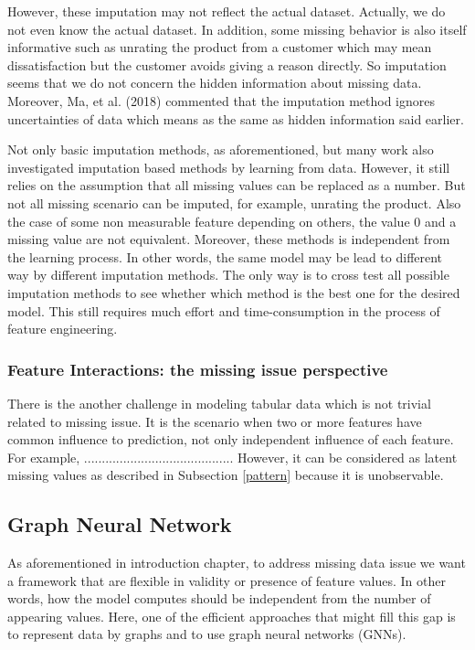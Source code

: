 However, these imputation may not reflect the actual dataset. \cite{...}
Actually, we do not even know the actual dataset.
In addition, some missing behavior is also itself informative \cite{...} such as unrating the product from a customer which may mean dissatisfaction but the customer avoids giving a reason directly.
So imputation seems that we do not concern the hidden information about missing data.
Moreover, Ma, et al. (2018) \cite{Ma} commented that the imputation method ignores uncertainties of data which means as the same as hidden information said earlier.

Not only basic imputation methods, as aforementioned, but many work also investigated imputation based methods by learning from data.
However, it still relies on the assumption that all missing values can be replaced as a number.
But not all missing scenario can be imputed, for example, unrating the product.
Also the case of some non measurable feature depending on others, the value 0 and a missing value are not equivalent.
Moreover, these methods is independent from the learning process.
In other words, the same model may be lead to different way by different imputation methods.
The only way is to cross test all possible imputation methods to see whether which method is the best one for the desired model.
This still requires much effort and time-consumption in the process of feature engineering.


\subsubsection{Feature Interactions: the missing issue perspective}
There is the another challenge in modeling tabular data which is not trivial related to missing issue.
It is the scenario when two or more features have common influence to prediction, not only independent influence of each feature.
For example, ..........................................
However, it can be considered as latent missing values as described in Subsection \ref{pattern} because it is unobservable.






\subsection{Graph Neural Network}
As aforementioned in introduction chapter, to address missing data issue we want a framework that are flexible in validity or presence of feature values.
In other words, how the model computes should be independent from the number of appearing values. 
Here, one of the efficient approaches that might fill this gap is to represent data by graphs and to use graph neural networks (GNNs).

